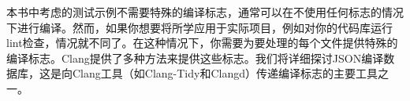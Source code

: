 本书中考虑的测试示例不需要特殊的编译标志，通常可以在不使用任何标志的情况下进行编译。然而，如果你想要将所学应用于实际项目，例如对你的代码库运行lint检查，情况就不同了。在这种情况下，你需要为要处理的每个文件提供特殊的编译标志。Clang提供了多种方法来提供这些标志。我们将详细探讨JSON编译数据库，这是向Clang工具（如Clang-Tidy和Clangd）传递编译标志的主要工具之一。
